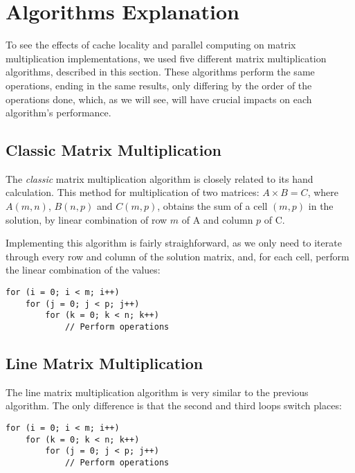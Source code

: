 \section{Algorithms Explanation} \label{section:algorithms}

To see the effects of cache locality and parallel computing on matrix multiplication implementations, we used five different matrix multiplication algorithms, described in this section. These algorithms perform the same operations, ending in the same results, only differing by the order of the operations done, which, as we will see, will have crucial impacts on each algorithm's performance.

\subsection{Classic Matrix Multiplication}

The \textit{classic} matrix multiplication algorithm is closely related to its hand calculation. This method for multiplication of two matrices: $A \times B = C$, where $A(m, n)$, $B(n, p)$ and $C(m, p)$, obtains the sum of a cell $(m,p)$ in the solution, by linear combination of row $m$ of A and column $p$ of C.

Implementing this algorithm is fairly straighforward, as we only need to iterate through every row and column of the solution matrix, and, for each cell, perform the linear combination of the values:

\begin{verbatim}
for (i = 0; i < m; i++)
    for (j = 0; j < p; j++)
        for (k = 0; k < n; k++)
            // Perform operations
\end{verbatim}

    
\subsection{Line Matrix Multiplication}

The line matrix multiplication algorithm is very similar to the previous algorithm. The only difference is that the second and third loops switch places:

\begin{verbatim}
for (i = 0; i < m; i++)
    for (k = 0; k < n; k++)
        for (j = 0; j < p; j++)
            // Perform operations
\end{verbatim}


